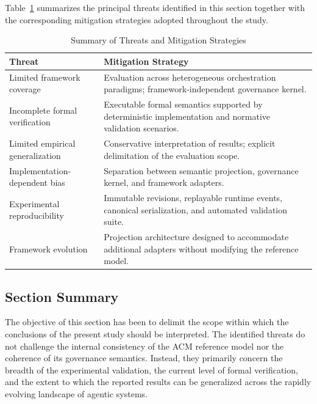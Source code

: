 \documentclass[10pt]{article}
\begin{document}
Table~\ref{tab:mitigation_strategies} summarizes the principal threats identified in this section together with the corresponding mitigation strategies adopted throughout the study.

\begin{table}[t]
\caption{Summary of Threats and Mitigation Strategies}
\label{tab:mitigation_strategies}
\centering
\begin{tabular}{p{4.2cm}p{3.9cm}}
\toprule
\textbf{Threat} & \textbf{Mitigation Strategy} \\
\midrule
Limited framework coverage &
Evaluation across heterogeneous orchestration paradigms; framework-independent governance kernel. \\

Incomplete formal verification &
Executable formal semantics supported by deterministic implementation and normative validation scenarios. \\

Limited empirical generalization &
Conservative interpretation of results; explicit delimitation of the evaluation scope. \\

Implementation-dependent bias &
Separation between semantic projection, governance kernel, and framework adapters. \\

Experimental reproducibility &
Immutable revisions, replayable runtime events, canonical serialization, and automated validation suite. \\

Framework evolution &
Projection architecture designed to accommodate additional adapters without modifying the reference model. \\
\bottomrule
\end{tabular}
\end{table}

\subsection{Section Summary}
\label{sec:threats_summary}

The objective of this section has been to delimit the scope within which the conclusions of the present study should be interpreted. The identified threats do not challenge the internal consistency of the ACM reference model nor the coherence of its governance semantics. Instead, they primarily concern the breadth of the experimental validation, the current level of formal verification, and the extent to which the reported results can be generalized across the rapidly evolving landscape of agentic systems.
\end{document}
